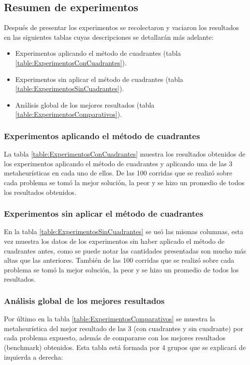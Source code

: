 \subsection{Resumen de experimentos}
Después de presentar los experimentos se recolectaron y vaciaron los resultados en las siguientes tablas cuyas descripciones se detallarán más adelante: 

\begin{itemize}
    \item Experimentos aplicando el método de cuadrantes (tabla \ref{table:ExperimentosConCuadrantes}).
    \item Experimentos sin aplicar el método de cuadrantes (tabla \ref{table:ExperimentosSinCuadrantes}).
    \item Análisis global de los mejores resultados (tabla \ref{table:ExperimentosComparativos}).
\end{itemize}
        
\subsubsection{Experimentos aplicando el método de cuadrantes}  
 La tabla \ref{table:ExperimentosConCuadrantes} muestra los resultados obtenidos de los experimentos aplicando el método de cuadrantes y aplicando una de las 3 metaheurísticas en cada uno de ellos. De las 100 corridas que se realizó sobre cada problema se tomó la mejor solución, la peor y se hizo un promedio de todos los resultados obtenidos.
 
 

\subsubsection{Experimentos sin aplicar el método de cuadrantes}
En la tabla \ref{table:ExperimentosSinCuadrantes} se usó las mismas columnas, esta vez muestra los datos de los experimentos sin haber aplicado el método de cuadrantes antes, como se puede notar las cantidades presentadas son mucho más altas que las anteriores. También de las 100 corridas que se realizó sobre cada problema se tomó la mejor solución, la peor y se hizo un promedio de todos los resultados.

 

\subsubsection{Análisis global de los mejores resultados}
Por último en la tabla \ref{table:ExperimentosComparativos} se muestra la metaheurística del mejor resultado de las 3 (con cuadrantes y sin cuadrante) por cada problema expuesto, además de compararse con los mejores resultados (benchmark) obtenidos. Esta tabla está formada por 4 grupos que se explicará de izquierda a derecha:

